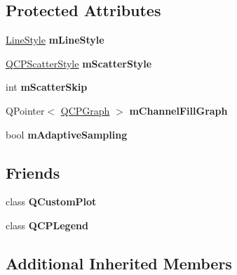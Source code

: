\subsection*{Protected Attributes}
\begin{DoxyCompactItemize}
\item 
\hyperlink{classQCPGraph_ad60175cd9b5cac937c5ee685c32c0859}{Line\+Style} {\bfseries m\+Line\+Style}\hypertarget{classQCPGraph_a8604fd98402035a63375849f7341ee25}{}\label{classQCPGraph_a8604fd98402035a63375849f7341ee25}

\item 
\hyperlink{classQCPScatterStyle}{Q\+C\+P\+Scatter\+Style} {\bfseries m\+Scatter\+Style}\hypertarget{classQCPGraph_a4aa36241f166ccd1f75fc8f24e4a3247}{}\label{classQCPGraph_a4aa36241f166ccd1f75fc8f24e4a3247}

\item 
int {\bfseries m\+Scatter\+Skip}\hypertarget{classQCPGraph_a4ca1e50fbfe8307022b42a6f6178fae0}{}\label{classQCPGraph_a4ca1e50fbfe8307022b42a6f6178fae0}

\item 
Q\+Pointer$<$ \hyperlink{classQCPGraph}{Q\+C\+P\+Graph} $>$ {\bfseries m\+Channel\+Fill\+Graph}\hypertarget{classQCPGraph_a2f1777c7accf8244fc640c33f0b04577}{}\label{classQCPGraph_a2f1777c7accf8244fc640c33f0b04577}

\item 
bool {\bfseries m\+Adaptive\+Sampling}\hypertarget{classQCPGraph_aa951e78aeba714cf443be6da2e52502e}{}\label{classQCPGraph_aa951e78aeba714cf443be6da2e52502e}

\end{DoxyCompactItemize}
\subsection*{Friends}
\begin{DoxyCompactItemize}
\item 
class {\bfseries Q\+Custom\+Plot}\hypertarget{classQCPGraph_a1cdf9df76adcfae45261690aa0ca2198}{}\label{classQCPGraph_a1cdf9df76adcfae45261690aa0ca2198}

\item 
class {\bfseries Q\+C\+P\+Legend}\hypertarget{classQCPGraph_a8429035e7adfbd7f05805a6530ad5e3b}{}\label{classQCPGraph_a8429035e7adfbd7f05805a6530ad5e3b}

\end{DoxyCompactItemize}
\subsection*{Additional Inherited Members}


